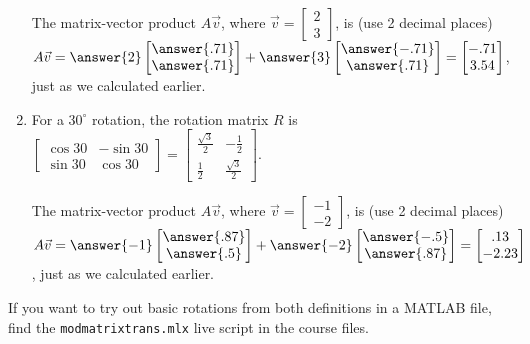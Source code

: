 \documentclass{ximera}
\begin{document}
\begin{exploration}
\begin{remark}
\begin{example}
\begin{enumerate}
                The matrix-vector product $A\vec{v}$, where $\vec{v}=\begin{bmatrix} 2 \\ 3 \end{bmatrix}$, is (use 2 decimal places) $A\vec{v}=\answer{2}\begin{bmatrix} \answer{.71} \\ \answer{.71} \end{bmatrix} + \answer{3}\begin{bmatrix} \answer{-.71} \\ \answer{.71} \end{bmatrix} = \begin{bmatrix} -.71 \\ 3.54 \end{bmatrix}$, just as we calculated earlier.

                \item For a $30^\circ$ rotation, the rotation matrix $R$ is $\begin{bmatrix} \cos 30 & -\sin 30 \\ \sin 30 & \cos 30 \end{bmatrix} = \begin{bmatrix} \frac{\sqrt{3}}{2} & -\frac{1}{2} \\ \frac{1}{2} & \frac{\sqrt{3}}{2} \end{bmatrix}$.
                
                The matrix-vector product $A\vec{v}$, where $\vec{v}=\begin{bmatrix} -1 \\ -2 \end{bmatrix}$, is (use 2 decimal places) $A\vec{v}=\answer{-1}\begin{bmatrix} \answer{.87} \\ \answer{.5} \end{bmatrix} + \answer{-2}\begin{bmatrix} \answer{-.5} \\ \answer{.87} \end{bmatrix} = \begin{bmatrix} .13 \\ -2.23 \end{bmatrix}$, just as we calculated earlier.
            \end{enumerate}

            \begin{hint}
            
                If you want to try out basic rotations from both definitions in a MATLAB file, find the \texttt{mod\textunderscore matrix\textunderscore trans.mlx} live script in the course files.


\end{hint}
\end{example}
\end{remark}
\end{exploration}
\end{document}
